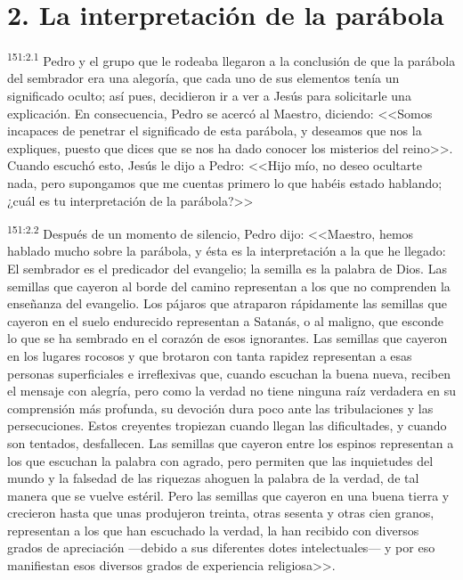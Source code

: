 \section*{2. La interpretación de la parábola}
\par 
\textsuperscript{151:2.1} Pedro y el grupo que le rodeaba llegaron a la conclusión de que la parábola del sembrador era una alegoría, que cada uno de sus elementos tenía un significado oculto; así pues, decidieron ir a ver a Jesús para solicitarle una explicación. En consecuencia, Pedro se acercó al Maestro, diciendo: <<Somos incapaces de penetrar el significado de esta parábola, y deseamos que nos la expliques, puesto que dices que se nos ha dado conocer los misterios del reino>>. Cuando escuchó esto, Jesús le dijo a Pedro: <<Hijo mío, no deseo ocultarte nada, pero supongamos que me cuentas primero lo que habéis estado hablando; ¿cuál es tu interpretación de la parábola?>>

\par 
\textsuperscript{151:2.2} Después de un momento de silencio, Pedro dijo: <<Maestro, hemos hablado mucho sobre la parábola, y ésta es la interpretación a la que he llegado: El sembrador es el predicador del evangelio; la semilla es la palabra de Dios. Las semillas que cayeron al borde del camino representan a los que no comprenden la enseñanza del evangelio. Los pájaros que atraparon rápidamente las semillas que cayeron en el suelo endurecido representan a Satanás, o al maligno, que esconde lo que se ha sembrado en el corazón de esos ignorantes. Las semillas que cayeron en los lugares rocosos y que brotaron con tanta rapidez representan a esas personas superficiales e irreflexivas que, cuando escuchan la buena nueva, reciben el mensaje con alegría, pero como la verdad no tiene ninguna raíz verdadera en su comprensión más profunda, su devoción dura poco ante las tribulaciones y las persecuciones. Estos creyentes tropiezan cuando llegan las dificultades, y cuando son tentados, desfallecen. Las semillas que cayeron entre los espinos representan a los que escuchan la palabra con agrado, pero permiten que las inquietudes del mundo y la falsedad de las riquezas ahoguen la palabra de la verdad, de tal manera que se vuelve estéril. Pero las semillas que cayeron en una buena tierra y crecieron hasta que unas produjeron treinta, otras sesenta y otras cien granos, representan a los que han escuchado la verdad, la han recibido con diversos grados de apreciación ---debido a sus diferentes dotes intelectuales--- y por eso manifiestan esos diversos grados de experiencia religiosa>>.

